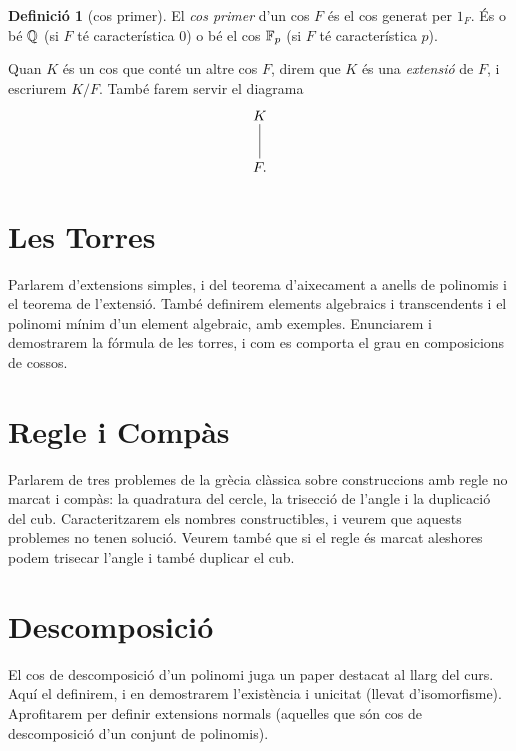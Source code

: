 \documentclass[
]{book}
\theoremstyle{definition}
\newtheorem{definition}{Definició}[chapter]
\theoremstyle{definition}
\theoremstyle{definition}
\theoremstyle{definition}
\theoremstyle{remark}
\begin{document}
\begin{definition}[cos primer]
\protect\hypertarget{def:cos-primer}{}\label{def:cos-primer}El \emph{cos primer} d'un cos \(F\) és el cos generat per \(1_F\). És o bé \(\mathbb{Q}\) (si \(F\) té característica \(0\)) o bé el cos \(\mathbb{F}_p\)
(si \(F\) té característica \(p\)).
\end{definition}

Quan \(K\) és un cos que conté un altre cos \(F\), direm que \(K\) és una \emph{extensió} de \(F\), i escriurem \(K/F\). També farem servir
el diagrama
\[
\begin{xy}
\xymatrix{
  K\ar@{-}[d]\\
  F.
}
\end{xy}
\]

\hypertarget{les-torres}{%
\chapter{Les Torres}\label{les-torres}}

Parlarem d'extensions simples, i del teorema d'aixecament a anells de polinomis i el teorema de l'extensió.
També definirem elements algebraics i transcendents i el polinomi mínim d'un element algebraic, amb exemples.
Enunciarem i demostrarem la fórmula de les torres, i com es comporta el grau en composicions de cossos.

\hypertarget{regle-i-compuxe0s}{%
\chapter{Regle i Compàs}\label{regle-i-compuxe0s}}

Parlarem de tres problemes de la grècia clàssica sobre construccions amb regle no marcat i compàs: la quadratura del cercle,
la trisecció de l'angle i la duplicació del cub. Caracteritzarem els nombres constructibles, i veurem que aquests problemes
no tenen solució. Veurem també que si el regle és marcat aleshores podem trisecar l'angle i també duplicar el cub.

\hypertarget{descomposiciuxf3}{%
\chapter{Descomposició}\label{descomposiciuxf3}}

El cos de descomposició d'un polinomi juga un paper destacat al llarg del curs.
Aquí el definirem, i en demostrarem l'existència i unicitat (llevat d'isomorfisme).
Aprofitarem per definir extensions normals (aquelles que són cos de descomposició d'un conjunt de polinomis).
\end{document}
